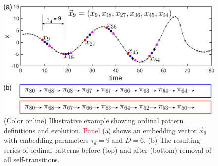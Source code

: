 \documentclass[12pt,aip,cha,reprint,nofootinbib]{revtex4-1}
\begin{document}
\begin{figure}
	\centering
	\includegraphics[width=1.3\columnwidth]{timeseriesOPexample.eps}
\caption{(Color online) Illustrative example showing ordinal pattern definitions and evolution. \textcolor{red}{Panel} (a) shows an embedding vector $\vec{x}_{9}$ with embedding parameters $\tau_d = 9$ and $D = 6$. (b) The resulting series of ordinal patterns before (top) and after (bottom) removal of all self-transitions. \label{fig:OPexample}}
\end{figure}
\end{document}

